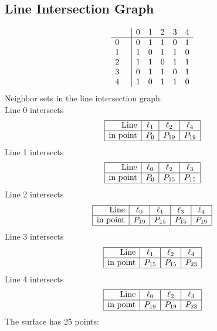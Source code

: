 \documentclass{article}
\begin{document}
{\subsection*{Line Intersection Graph}
{\arraycolsep=1pt
$$
\begin{array}{rr|*{5}r}
 &  & 0 & 1 & 2 & 3 & 4\\
\hline
0 &  & 0 & 1 & 1 & 0 & 1\\
1 &  & 1 & 0 & 1 & 1 & 0\\
2 &  & 1 & 1 & 0 & 1 & 1\\
3 &  & 0 & 1 & 1 & 0 & 1\\
4 &  & 1 & 0 & 1 & 1 & 0\\
\end{array}
$$
}%
Neighbor sets in the line intersection graph:\\
Line 0 intersects 
$$
\begin{array}{|r*{3}{|c}|}
\hline
\mbox{Line}  & \ell_{1} & \ell_{2} & \ell_{4}\\
\hline
\mbox{in point}  & P_{0} & P_{19} & P_{19}\\
\hline
\end{array}
$$
Line 1 intersects 
$$
\begin{array}{|r*{3}{|c}|}
\hline
\mbox{Line}  & \ell_{0} & \ell_{2} & \ell_{3}\\
\hline
\mbox{in point}  & P_{0} & P_{15} & P_{15}\\
\hline
\end{array}
$$
Line 2 intersects 
$$
\begin{array}{|r*{4}{|c}|}
\hline
\mbox{Line}  & \ell_{0} & \ell_{1} & \ell_{3} & \ell_{4}\\
\hline
\mbox{in point}  & P_{19} & P_{15} & P_{15} & P_{19}\\
\hline
\end{array}
$$
Line 3 intersects 
$$
\begin{array}{|r*{3}{|c}|}
\hline
\mbox{Line}  & \ell_{1} & \ell_{2} & \ell_{4}\\
\hline
\mbox{in point}  & P_{15} & P_{15} & P_{23}\\
\hline
\end{array}
$$
Line 4 intersects 
$$
\begin{array}{|r*{3}{|c}|}
\hline
\mbox{Line}  & \ell_{0} & \ell_{2} & \ell_{3}\\
\hline
\mbox{in point}  & P_{19} & P_{19} & P_{23}\\
\hline
\end{array}
$$
The surface has 25 points:\\
}
\end{document}
